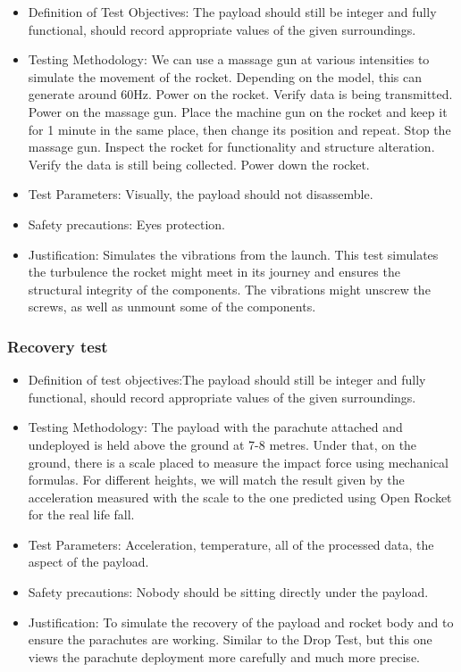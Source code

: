 \begin{itemize}
 \item Definition of Test Objectives: The payload should still be integer and fully functional, should record appropriate values of the given surroundings.
 \item Testing Methodology: We can use a massage gun at various intensities to simulate the movement of the rocket. Depending on the model, this can generate around 60Hz. Power on the rocket. Verify data is being transmitted. Power on the massage gun. Place the machine gun on the rocket and keep it for 1 minute in the same place, then change its position and repeat. Stop the massage gun. Inspect the rocket for functionality and structure alteration. Verify the data is still being collected. Power down the rocket.
 \item Test Parameters: Visually, the payload should not disassemble.
 \item Safety precautions: Eyes protection.
 \item Justification: Simulates the vibrations from the launch. This test simulates the turbulence the rocket might meet in its journey and ensures the structural integrity of the components. The vibrations might unscrew the screws, as well as unmount some of the components. 
\end{itemize}

\subsubsection{Recovery test}

\begin{itemize}
 \item Definition of test objectives:The payload should still be integer and fully functional, should record appropriate values of the given surroundings.
 \item Testing Methodology: The payload with the parachute attached and undeployed is held above the ground at 7-8 metres. Under that, on the ground, there is a scale placed to measure the impact force using mechanical formulas. For different heights, we will match the result given by the acceleration measured with the scale to the one predicted using Open Rocket for the real life fall.
 \item Test Parameters: Acceleration, temperature, all of the processed data, the aspect of the payload.
 \item Safety precautions: Nobody should be sitting directly under the payload.
 \item Justification: To simulate the recovery of the payload and rocket body and to ensure the parachutes are working. Similar to the Drop Test, but this one views the parachute deployment more carefully and much more precise. 
\end{itemize}

